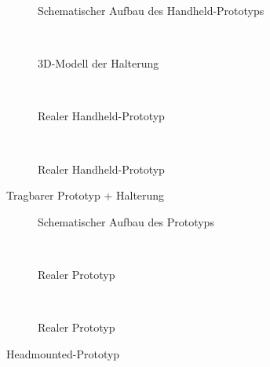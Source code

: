 \begin{figure}[H]
	\centering
	\begin{subfigure}[t]{0.55\textwidth}
		\centering
		\caption{Schematischer Aufbau des Handheld-Prototyps}
		\label{fig:study2_proto_hand_model}
	\end{subfigure}
	~
	\begin{subfigure}[t]{0.4\textwidth}
		\centering
		\caption{3D-Modell der Halterung}
		\label{fig:study2_proto_halterung}
	\end{subfigure}
	~
	\begin{subfigure}[t]{0.25\textwidth}
		\centering
		\caption{Realer Handheld-Prototyp}
		\label{fig:study2_proto_hand_front}
	\end{subfigure}
	~
	\begin{subfigure}[t]{0.25\textwidth}
		\centering
		\caption{Realer Handheld-Prototyp}
		\label{fig:study2_proto_hand_side}
	\end{subfigure}
	\caption{Tragbarer Prototyp + Halterung}
	\label{fig:study2_proto_hand}
\end{figure}

\begin{figure}[H]
	\centering
	\begin{subfigure}[t]{0.45\textwidth}
		\centering
		\caption{Schematischer Aufbau des Prototyps}
		\label{fig:study2_proto_head_model}
	\end{subfigure}
	~
	\begin{subfigure}[t]{0.25\textwidth}
		\centering
		\caption{Realer Prototyp}
		\label{fig:study2_proto_head_real}
	\end{subfigure}
	~
	\begin{subfigure}[t]{0.25\textwidth}
		\centering
		\caption{Realer Prototyp}
		\label{fig:study2_proto_head_side}
	\end{subfigure}
	\caption{Headmounted-Prototyp}
	\label{fig:study2_proto_head}
\end{figure}

